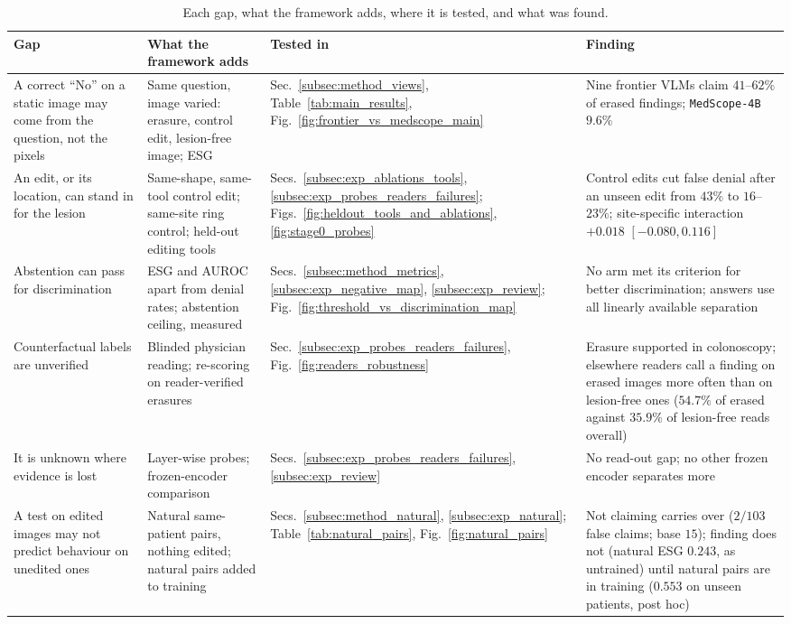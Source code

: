 \documentclass[5p,times,twocolumn,authoryear]{elsarticle}
\begin{document}
\begin{table}[!t]
\caption{Each gap, what the framework adds, where it is tested, and what was found.}
\label{tab:gap_map}
\begin{center}
\small
\begin{adjustbox}{max width=\linewidth}
\begin{tabular}{L{3.4cm}L{3.7cm}L{2.5cm}L{4.6cm}}
\toprule
\textbf{Gap} & \textbf{What the framework adds} & \textbf{Tested in} & \textbf{Finding} \\
\midrule
A correct ``No'' on a static image may come from the question, not the pixels & Same question, image varied: erasure, control edit, lesion-free image; ESG & Sec.~\ref{subsec:method_views}, Table~\ref{tab:main_results}, Fig.~\ref{fig:frontier_vs_medscope_main} & Nine frontier VLMs claim $41$--$62\%$ of erased findings; \texttt{MedScope-4B} $9.6\%$ \\
An edit, or its location, can stand in for the lesion & Same-shape, same-tool control edit; same-site ring control; held-out editing tools & Secs.~\ref{subsec:exp_ablations_tools}, \ref{subsec:exp_probes_readers_failures}; Figs.~\ref{fig:heldout_tools_and_ablations}, \ref{fig:stage0_probes} & Control edits cut false denial after an unseen edit from $43\%$ to $16$--$23\%$; site-specific interaction $+0.018$ $[-0.080, 0.116]$ \\
Abstention can pass for discrimination & ESG and AUROC apart from denial rates; abstention ceiling, measured & Secs.~\ref{subsec:method_metrics}, \ref{subsec:exp_negative_map}, \ref{subsec:exp_review}; Fig.~\ref{fig:threshold_vs_discrimination_map} & No arm met its criterion for better discrimination; answers use all linearly available separation \\
Counterfactual labels are unverified & Blinded physician reading; re-scoring on reader-verified erasures & Sec.~\ref{subsec:exp_probes_readers_failures}, Fig.~\ref{fig:readers_robustness} & Erasure supported in colonoscopy; elsewhere readers call a finding on erased images more often than on lesion-free ones ($54.7\%$ of erased against $35.9\%$ of lesion-free reads overall) \\
It is unknown where evidence is lost & Layer-wise probes; frozen-encoder comparison & Secs.~\ref{subsec:exp_probes_readers_failures}, \ref{subsec:exp_review} & No read-out gap; no other frozen encoder separates more \\
A test on edited images may not predict behaviour on unedited ones & Natural same-patient pairs, nothing edited; natural pairs added to training & Secs.~\ref{subsec:method_natural}, \ref{subsec:exp_natural}; Table~\ref{tab:natural_pairs}, Fig.~\ref{fig:natural_pairs} & Not claiming carries over ($2/103$ false claims; base $15$); finding does not (natural ESG $0.243$, as untrained) until natural pairs are in training ($0.553$ on unseen patients, post hoc) \\
\bottomrule
\end{tabular}
\end{adjustbox}
\end{center}
\end{table}
\end{document}
